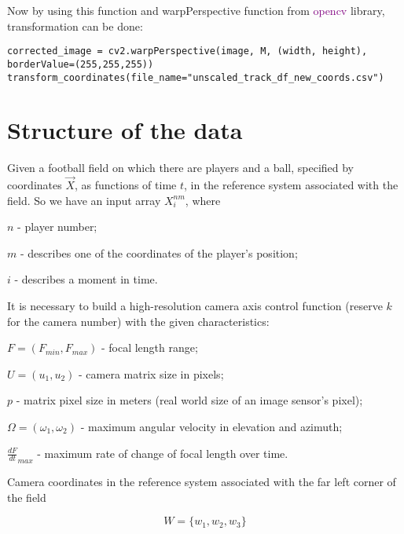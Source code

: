 

Now by using this function and warpPerspective function from \textcolor{purple}{opencv} library, transformation can be done:
\begin{lstlisting}
corrected_image = cv2.warpPerspective(image, M, (width, height), borderValue=(255,255,255))
transform_coordinates(file_name="unscaled_track_df_new_coords.csv")
\end{lstlisting}

\section{Structure of the data}

Given a football field on which there are players and a ball, specified by coordinates $\vec X$, as functions of time $t$, in the reference system associated with the field. So we have an input array $X^{nm}_i$, where

$n$ - player number;

$m$ - describes one of the coordinates of the player’s position;

$i$ - describes a moment in time.

It is necessary to build a high-resolution camera axis control function (reserve $k$ for the camera number) with the given characteristics:

$F=(F_{min},F_{max})$ - focal length range;

$U=(u_1,u_2)$ - camera matrix size in pixels;

$p$ - matrix pixel size in meters (real world size of an image sensor's pixel);

$\Omega=(\omega_1, \omega_2)$ - maximum angular velocity in elevation and azimuth;

$\frac{dF}{dt}_{max}$ - maximum rate of change of focal length over time.

Camera coordinates in the reference system associated with the far left corner of the field

$$W=\{w_1,w_2,w_3\}$$



